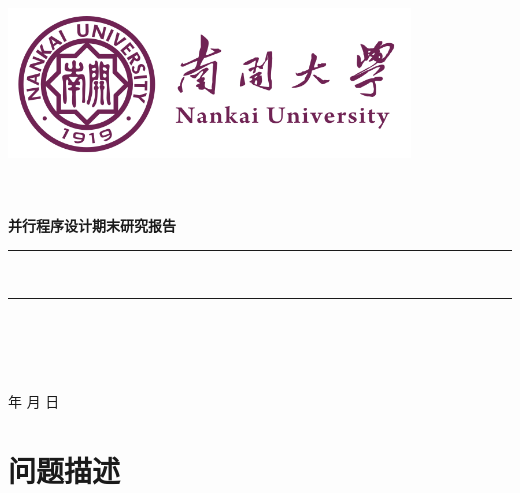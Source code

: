 \documentclass[a4paper]{article}
\newcommand{\HRule}{\rule{\linewidth}{0.5mm}}%
\begin{document}
\renewcommand{\contentsname}{目\ 录}
\renewcommand{\appendixname}{附录}
\renewcommand{\appendixpagename}{附录}
\renewcommand{\refname}{参考文献}
\renewcommand{\figurename}{图}
\renewcommand{\tablename}{表}
\renewcommand{\today}{\number\year 年 \number\month 月 \number\day 日}

\begin{titlepage}
  \begin{center}
    \includegraphics[width=0.8\textwidth]{NKU.png}\\[1cm]
    \vspace{20mm}
    \textbf{\huge\textbf{}}\\[0.5cm]
    \textbf{\huge{}}\\[2.3cm]
    \textbf{\Huge\textbf{}}

    \vspace{\fill}

    \textbf{\Large \textbf{并行程序设计期末研究报告}}\\[0.8cm]
    \HRule \\[0.9cm]
    \HRule \\[2.0cm]
    \centering
    \textsc{\LARGE {}}\\[0.5cm]
    \textsc{\LARGE {}}\\[0.5cm]
    \textsc{\LARGE {}}\\[0.5cm]

    \vfill
    {\Large \today}
  \end{center}
\end{titlepage}

\renewcommand {\thefigure}{\thesection{}.\arabic{figure}}%
\renewcommand{\figurename}{图}
\renewcommand{\contentsname}{目录}


\clearpage
\tableofcontents
\newpage

\section{问题描述}
\end{document}
